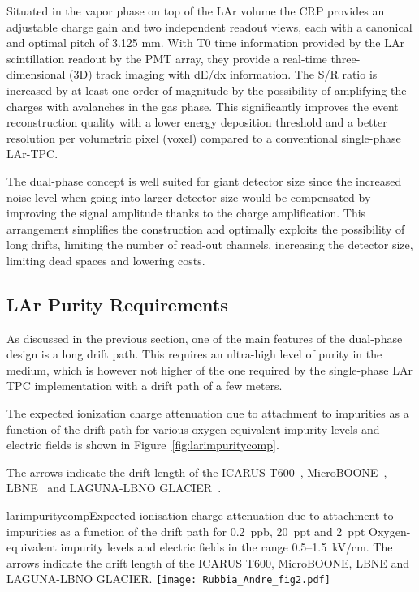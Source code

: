 Situated in the vapor phase on top of the LAr volume the CRP  provides an adjustable charge gain and two independent readout views, each with a canonical and optimal pitch of 3.125 mm.  With T0 time information provided by the LAr scintillation readout by the PMT array, they provide a real-time three-dimensional (3D) track imaging with dE/dx information. The S/R ratio is increased by at least one order of magnitude by the possibility of amplifying the charges with avalanches in the gas phase.  This significantly improves the event reconstruction quality with a lower energy deposition threshold and a better resolution per volumetric pixel (voxel) compared to a conventional single-phase LAr-TPC. 

The dual-phase concept is well suited for giant detector size since the increased noise level when going into larger detector size would be compensated by improving the signal amplitude thanks to the charge amplification.  This arrangement simplifies the construction and optimally exploits the possibility of long drifts, limiting the number of read-out channels, increasing the detector size, limiting dead spaces and lowering costs.

\subsection{LAr Purity Requirements}

As discussed in the previous section, one of the main features of the dual-phase design is a long drift path. This requires an ultra-high level of purity in the medium, which is however not higher of the one required by the single-phase LAr TPC implementation with a drift path of a few meters.

The expected ionization charge attenuation due to attachment to impurities as a function of the drift path for various oxygen-equivalent impurity levels and electric fields is shown in Figure~\ref{fig:larimpuritycomp}.

The arrows indicate the drift length of the ICARUS T600~\cite{Amerio:2004ze},  MicroBOONE~\cite{Chen:2007ae}, LBNE~\cite{Akiri:2011dv} 
and LAGUNA-LBNO GLACIER~\cite{Rubbia:2009md,Rubbia:2010zz}.


\begin{cdrfigure}{larimpuritycomp}{Expected ionisation charge attenuation due to attachment to impurities as a function of the drift path for 0.2~ppb, 20~ppt and  2~ppt Oxygen-equivalent impurity levels and electric fields in the range 0.5--1.5~kV/cm. The arrows indicate the drift length of the ICARUS T600, MicroBOONE, LBNE and LAGUNA-LBNO GLACIER.}
\texttt{[image: Rubbia\_Andre\_fig2.pdf]}
\end{cdrfigure}


